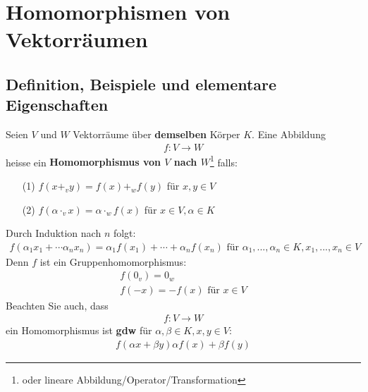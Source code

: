 \documentclass[11pt]{report}
\newcommand*\f[1] {\textbf{#1}}
\begin{document}
\chapter{Homomorphismen von Vektorräumen}
\section{Definition, Beispiele und elementare Eigenschaften}
Seien $V$ und $W$ Vektorräume über \f{demselben} Körper $K$.
Eine Abbildung
\begin{align}
 f: V \rightarrow W
\end{align}
heisse ein \f{Homomorphismus von $V$ nach $W$}\footnote{oder lineare Abbildung/Operator/Transformation} falls:
\begin{itemize}
 \item[(1)] $f(x +_v y) = f(x) +_w f(y)$ für $x,y \in V$
 \item[(2)] $f(\alpha \cdot_v x) = \alpha \cdot_w f(x)$ für $x \in V, \alpha \in K$
\end{itemize}
Durch Induktion nach $n$ folgt:
\begin{align}
 f(\alpha_1 x_1 + \cdots \alpha_n x_n) = \alpha_1 f(x_1) + \cdots + \alpha_n f(x_n) \text{ für } \alpha_1, ..., \alpha_n\in K, x_1, ..., x_n \in V
\end{align}
Denn $f$ ist ein Gruppenhomomorphismus:
\begin{align}
 f(0_v) = 0_w \\
 f(-x) = -f(x) \text{ für } x\in V
\end{align}
Beachten Sie auch, dass
\begin{align}
 f: V \rightarrow W
\end{align}
ein Homomorphismus ist \f{gdw} für $\alpha, \beta \in K, x, y \in V$:
\begin{align}
 f(\alpha x + \beta y)  \alpha f(x) + \beta f(y)
\end{align}
\end{document}
